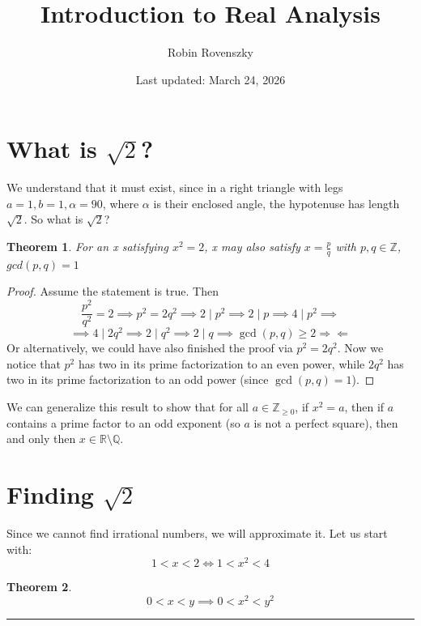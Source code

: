 \documentclass{article}
\title{Introduction to Real Analysis}
\author{Robin Rovenszky}
\date{Last updated: March 24, 2026}
\newtheorem{theorem}{Theorem}
\begin{document}
\maketitle
\tableofcontents
\newpage

\section{What is $\sqrt{2}$?}
We understand that it must exist, since in a right triangle with legs $a = 1, b= 1, \alpha = 90$, where $\alpha$ is their enclosed angle, the hypotenuse has length $\sqrt{2}$. So what is $\sqrt{2}$?
\\
\begin{theorem}
    For an x satisfying $x^2 = 2$, x may also satisfy $x = \frac{p}{q}$ with $p, q \in \mathbb{Z}$, $gcd(p, q) = 1$
\end{theorem}
\begin{proof}
    Assume the statement is true. Then
    \begin{equation}
        \frac{p^2}{q^2} = 2 \implies p^2 = 2q^2 \implies 2 \mid p^2 \implies 2 \mid p \implies 4 \mid p^2 \implies
    \end{equation}
    \begin{equation}
        \implies 4 \mid 2q^2 \implies 2 \mid q^2 \implies 2 \mid q \implies \gcd(p, q) \ge 2 \Rightarrow\!\Leftarrow
    \end{equation}
    Or alternatively, we could have also finished the proof via
    $p^2 = 2q^2$. Now we notice that $p^2$ has two in its prime factorization to an even power, while $2q^2$ has two in its prime factorization to an odd power (since $\gcd(p,q) = 1$).
\end{proof}

We can generalize this result to show that for all $a \in \mathbb{Z}_{\ge 0}$, if $x^2 = a$, then if $a$ contains a prime factor to an odd exponent (so $a$ is not a perfect square), then and only then $x \in \mathbb{R} \setminus \mathbb{Q}$.

\section{Finding $\sqrt{2}$}
Since we cannot find irrational numbers, we will approximate it. Let us start with:
\[
1 < x < 2 \Leftrightarrow 1 < x^2 < 4
\]
\begin{theorem}
    \[
    0 < x < y \implies 0 < x^2 < y^2
    \]
\end{theorem}
\hrule
\vspace{1em}
\end{document}
